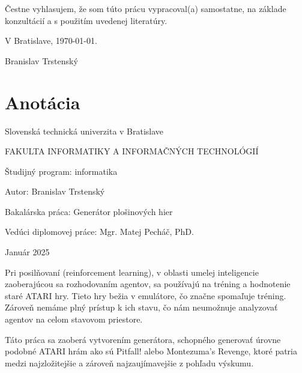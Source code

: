 \documentclass[11pt,slovak,a4paper]{article}
\begin{document}


\null \thispagestyle{empty}



\null \thispagestyle{empty}

\newpage

\null \thispagestyle{empty} \vfill

Čestne vyhlasujem, že som túto prácu vypracoval(a) samostatne, na základe konzultácií
a s použitím uvedenej literatúry.

V Bratislave, \today.

\begin{flushright}
    Branislav Trstenský
\end{flushright}

\newpage

\null \thispagestyle{empty}

\newpage

\section*{Anotácia}

Slovenská technická univerzita v Bratislave

FAKULTA INFORMATIKY A INFORMAČNÝCH TECHNOLÓGIÍ


Študijný program: \tab informatika

Autor: \tab Branislav Trstenský

Bakalárska práca: \tab Generátor plošinových hier

Vedúci diplomovej práce: \tab Mgr. Matej Pecháč, PhD.

Január 2025


Pri posilňovaní (reinforcement learning), v oblasti umelej inteligencie zaoberajúcou sa rozhodovaním agentov, sa používajú na tréning a hodnotenie staré ATARI hry. Tieto hry bežia v emulátore, čo značne spomaľuje tréning. Zároveň nemáme plný prístup k ich stavu, čo nám neumožnuje analyzovať agentov na celom stavovom priestore. 

Táto práca sa zaoberá vytvorením generátora, schopného generovať úrovne podobné ATARI hrám ako sú Pitfall! alebo Montezuma's Revenge, ktoré patria medzi najzložitejšie a zároveň najzaujímavejšie z pohľadu výskumu.
\end{document}
